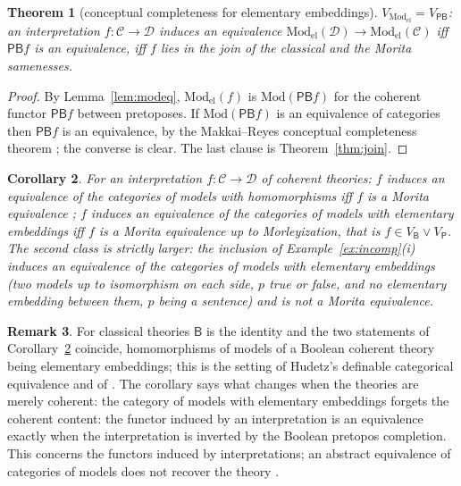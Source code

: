 \documentclass[11pt]{amsart}
\newtheorem{thm}{Theorem}[section]
\newtheorem{cor}[thm]{Corollary}
\theoremstyle{definition}
\newtheorem{rem}[thm]{Remark}
\newcommand{\Mod}{\mathrm{Mod}}
\newcommand{\Model}{\mathrm{Mod}_{\mathrm{el}}}
\newcommand{\PP}{\mathsf P}
\newcommand{\BB}{\mathsf B}
\newcommand{\cC}{\mathcal C}
\newcommand{\cD}{\mathcal D}
\begin{document}
\begin{thm}[conceptual completeness for elementary embeddings]\label{thm:cc}
$V_{\Model}=V_{\PP\BB}$: an interpretation $f\colon\cC\to\cD$ induces an
equivalence $\Model(\cD)\to\Model(\cC)$ iff $\PP\BB f$ is an equivalence,
iff $f$ lies in the join of the classical and the Morita samenesses.
\end{thm}
\begin{proof}
By Lemma~\ref{lem:modeq}, $\Model(f)$ is $\Mod(\PP\BB f)$ for the
coherent functor $\PP\BB f$ between pretoposes. If $\Mod(\PP\BB f)$ is an
equivalence of categories then $\PP\BB f$ is an equivalence, by the
Makkai--Reyes conceptual completeness theorem \cite[7.1.8]{MR77}; the
converse is clear. The last clause is Theorem~\ref{thm:join}.
\end{proof}

\begin{cor}\label{cor:morphisms}
For an interpretation $f\colon\cC\to\cD$ of coherent theories:
$f$ induces an equivalence of the categories of models with
homomorphisms iff $f$ is a Morita equivalence \cite[Thm.~6.1]{TheoryComp};
$f$ induces an equivalence of the categories of models with elementary
embeddings iff $f$ is a Morita equivalence up to Morleyization, that is
$f\in V_\BB\vee V_\PP$. The second class is strictly larger: the
inclusion of Example~\ref{ex:incomp}(i) induces an equivalence of the
categories of models with elementary embeddings (two models up to
isomorphism on each side, $p$ true or false, and no elementary embedding between them, $p$
being a sentence) and is not a Morita equivalence.
\end{cor}

\begin{rem}
For classical theories $\BB$ is the identity and the two statements of
Corollary~\ref{cor:morphisms} coincide, homomorphisms of models of a
Boolean coherent theory being elementary embeddings; this is the setting
of Hudetz's definable categorical equivalence \cite{Hudetz19} and of
\cite[Cor.~6.2]{TheoryComp}. The corollary says what changes when the
theories are merely coherent: the category of models with elementary
embeddings forgets the coherent content: the functor induced by an
interpretation is an equivalence exactly when the interpretation is
inverted by the Boolean pretopos completion. This concerns the functors
induced by interpretations; an abstract equivalence of categories of
models does not recover the theory \cite{HT17}.
\end{rem}
\end{document}
